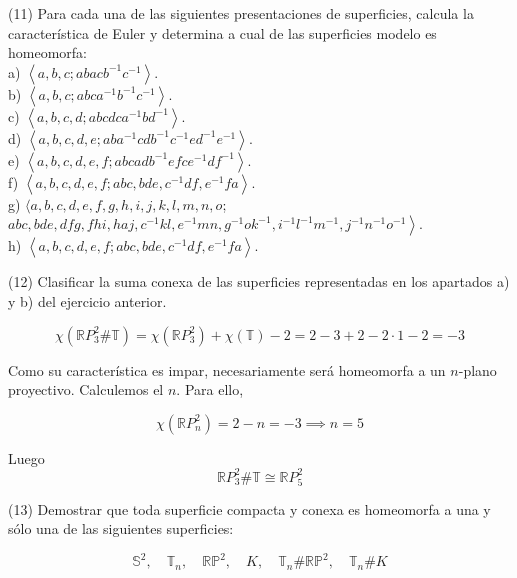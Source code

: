 \documentclass[
  a4paper,
  spanish,
  12pt,
]{scrartcl}
\begin{document}
\begin{ejer}
(11) Para cada una de las siguientes presentaciones de superficies, calcula la característica de Euler y determina a cual de las superficies modelo es homeomorfa:\\
a) $\left\langle a, b, c ; a b a c b^{-1} c^{-1}\right\rangle$.\\
b) $\left\langle a, b, c ; a b c a^{-1} b^{-1} c^{-1}\right\rangle$.\\
c) $\left\langle a, b, c, d ; a b c d c a^{-1} b d^{-1}\right\rangle$.\\
d) $\left\langle a, b, c, d, e ; a b a^{-1} c d b^{-1} c^{-1} e d^{-1} e^{-1}\right\rangle$.\\
e) $\left\langle a, b, c, d, e, f ; a b c a d b^{-1} e f c e^{-1} d f^{-1}\right\rangle$.\\
f) $\left\langle a, b, c, d, e, f ; a b c, b d e, c^{-1} d f, e^{-1} f a\right\rangle$.\\
g) $\langle a, b, c, d, e, f, g, h, i, j, k, l, m, n, o$;\\
$\left.a b c, b d e, d f g, f h i, h a j, c^{-1} k l, e^{-1} m n, g^{-1} o k^{-1}, i^{-1} l^{-1} m^{-1}, j^{-1} n^{-1} o^{-1}\right\rangle$.\\
h) $\left\langle a, b, c, d, e, f ; a b c, b d e, c^{-1} d f, e^{-1} f a\right\rangle$.\\
\end{ejer}

\begin{ejer}
(12) Clasificar la suma conexa de las superficies representadas en los apartados a) y b) del ejercicio anterior.\\
\end{ejer}

\begin{sol}

$$
\chi(\mathbb{R}P^2_3 \# \mathbb{T}) = \chi(\mathbb{R}P^2_3) + \chi(\mathbb{T}) - 2 = 2-3 +2-2\cdot 1 -2 = -3
$$

Como su característica es impar, necesariamente será homeomorfa a un $n$-plano proyectivo.
Calculemos el $n$.
Para ello, 

$$
\chi(\mathbb{R}P^2_n) = 2-n = -3 \implies n = 5
$$

Luego
$$
\mathbb{R}P^2_3 \# \mathbb{T} \cong \mathbb{R}P^2_5
$$

\end{sol}

\begin{ejer}
(13) Demostrar que toda superficie compacta y conexa es homeomorfa a una y sólo una de las siguientes superficies:

$$
\mathbb{S}^{2}, \quad \mathbb{T}_{n}, \quad \mathbb{R P}^{2}, \quad K, \quad \mathbb{T}_{n} \# \mathbb{R} \mathbb{P}^{2}, \quad \mathbb{T}_{n} \# K
$$
\end{ejer}
\end{document}
